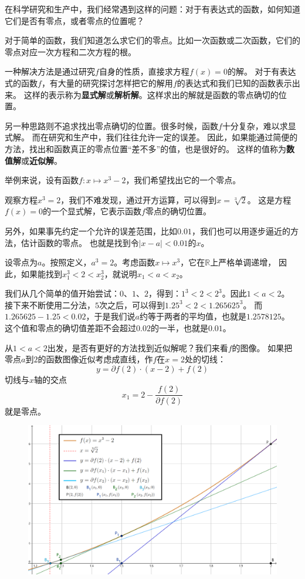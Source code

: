 \documentclass[12pt,UTF8]{ctexbook}
\begin{document}
在科学研究和生产中，我们经常遇到这样的问题：对于有表达式的函数，如何知道它们是否有零点，或者零点的位置呢？

对于简单的函数，我们知道怎么求它们的零点。比如一次函数或二次函数，它们的零点对应一次方程和二次方程的根。

一种解决方法是通过研究$f$自身的性质，直接求方程$f(x) = 0$的解。
对于有表达式的函数$f$，有大量的研究探讨怎样把它的解用$f$的表达式和我们已知的函数表示出来。
这样的表示称为\textbf{显式解}或\textbf{解析解}。这样求出的解就是函数的零点确切的位置。

另一种思路则不追求找出零点确切的位置。很多时候，函数$f$十分复杂，难以求显式解。
而在研究和生产中，我们往往允许一定的误差。
因此，如果能通过简便的方法，找出和函数真正的零点位置“差不多”的值，也是很好的。
这样的值称为\textbf{数值解}或\textbf{近似解}。

举例来说，设有函数$f: x\mapsto x^3 - 2$，我们希望找出它的一个零点。

观察方程$x^3 = 2$，我们不难发现，通过开方运算，可以得到$x = \sqrt[3]{2}$。
这是方程$f(x) = 0$的一个显式解，它表示函数$f$零点的确切位置。

另外，如果事先约定一个允许的误差范围，比如$0.01$，我们也可以用逐步逼近的方法，估计函数的零点。
也就是找到令$|x - a| < 0.01$的$x$。

设零点为$a$。按照定义，$a^3 = 2$。考虑函数$x\mapsto x^3$，它在$\mathbb{R}$上严格单调递增，
因此，如果能找到$x_1^3 < 2 < x_2^3$，就说明$x_1 < a < x_2$。

我们从几个简单的值开始尝试：$0$、$1$、$2$，得到：$1^3 < 2 < 2^3$。因此$1 < a < 2$。
接下来不断使用二分法，$5$次之后，可以得到$1.25^3 < 2 < 1.265625^3$。
而$1.265625 - 1.25 < 0.02$，于是我们说$a$约等于两者的平均值，也就是$1.2578125$。
这个值和零点的确切值差距不会超过$0.02$的一半，也就是$0.01$。

从$1 < a < 2$出发，是否有更好的方法找到近似解呢？我们来看$f$的图像。
如果把零点$a$到$2$的函数图像近似考虑成直线，作$f$在$x=2$处的切线：
$$ y = \partial f(2)\cdot (x - 2) + f(2) $$
切线与$x$轴的交点
$$ x_1 = 2 - \frac{f(2)}{\partial f(2)} $$
就是零点。

\begin{figure}[h]
    \vspace{4pt}
    \centering
    \includegraphics[width=\textwidth]{tu/切线法1.png}
\end{figure}
\end{document}
